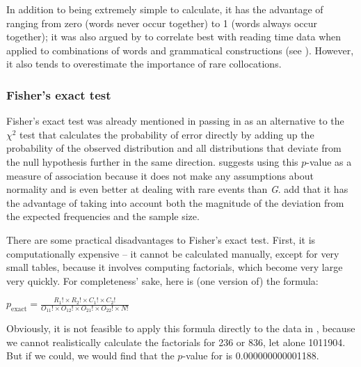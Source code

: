 In addition to being extremely simple to calculate, it has the advantage of ranging from zero (words never occur together) to 1 (words always occur together); it was also argued by \citet{wiechmann_computation_2008} to correlate  best with reading time data when applied to combinations of words and grammatical constructions (see ). However, it also tends to overestimate the importance of rare  collocations.

\subsubsection{Fisher's exact test}
\label{sec:amfishersexacttest}

Fisher's exact test  was already mentioned in passing in  as an alternative to the $\chi^2$  test that calculates the probability  of error directly by adding up the probability of the observed distribution  and all distributions that deviate from the null hypothesis  further in the same direction. \citet{pedersen_fishing_1996} suggests using this $p$-value as a measure of association  because it does not make any assumptions about normality and is even better at dealing with rare events than \emph{G}.  \citet[238--239]{stefanowitsch_collostructions:_2003} add that it has the advantage of taking into account both the magnitude of the deviation from the expected  frequencies and the sample  size.\largerpage[2]

There are some practical disadvantages to Fisher's exact test.  First, it is computationally expensive -- it cannot be calculated manually, except for very small tables, because it involves computing factorials, which become very large very quickly. For completeness' sake, here is (one version of) the formula:

\begin{exe}
\ex $\displaystyle{p_\text{exact} = \frac{R_1! \times R_2! \times C_1! \times C_2!}{O_{11}! \times O_{12}! \times O_{21}! \times O_{22}! \times N!}}$
\label{ex:fisherexaxt}
\end{exe}

Obviously, it is not feasible to apply this formula directly to the data in , because we cannot realistically calculate the factorials for 236 or 836, let alone \num{1011904}. But if we could, we would find that the $p$-value for  is 0.000000000001188.

